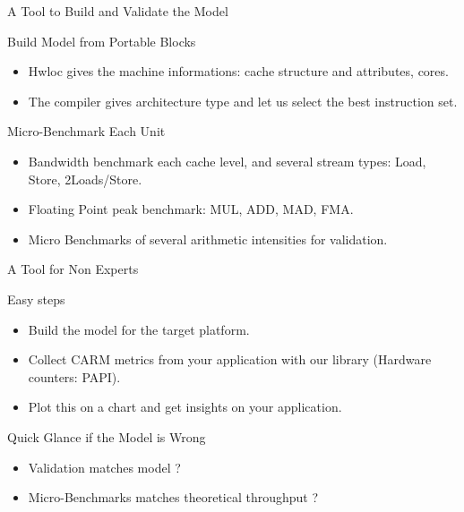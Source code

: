\begin{nframe}{A Tool to Build and Validate the Model}
  \begin{block}{Build Model from Portable Blocks}
    \begin{itemize}
    \item Hwloc gives the machine informations: cache structure and attributes, cores.
    \item The compiler gives architecture type and let us select the best instruction set.
    \end{itemize}
  \end{block}

  \begin{block}{Micro-Benchmark Each Unit}
    \begin{itemize}
    \item Bandwidth benchmark each cache level, and several stream types: Load, Store, 2Loads/Store.
    \item Floating Point peak benchmark: MUL, ADD, MAD, FMA.
    \item Micro Benchmarks of several arithmetic intensities for validation.
    \end{itemize}
  \end{block}
\end{nframe}

\begin{nframe}{A Tool for Non Experts}
  \begin{block}{Easy steps}
    \begin{itemize}
    \item Build the model for the target platform.
    \item Collect CARM metrics from your application with our library (Hardware counters: PAPI).
    \item Plot this on a chart and get insights on your application.
    \end{itemize}
  \end{block}

  \begin{block}{Quick Glance if the Model is Wrong}
    \begin{itemize}
    \item Validation matches model ?
    \item Micro-Benchmarks matches theoretical throughput ?
    \end{itemize}
  \end{block}
\end{nframe}

